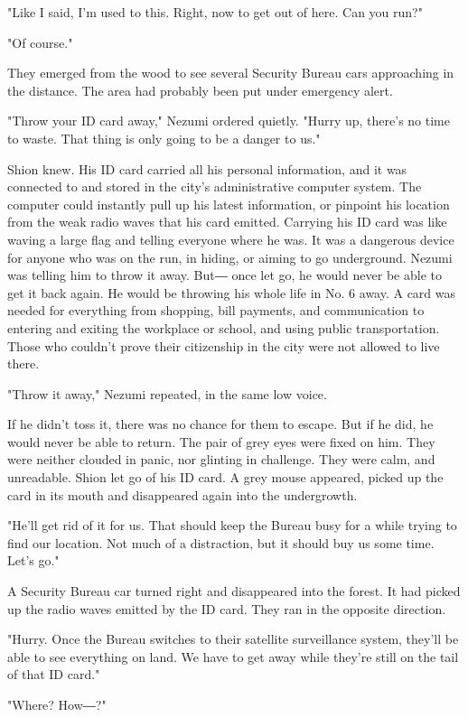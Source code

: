 "Like I said, I'm used to this. Right, now to get out of here. Can you
run?"

"Of course."

They emerged from the wood to see several Security Bureau cars
approaching in the distance. The area had probably been put under
emergency alert.

"Throw your ID card away," Nezumi ordered quietly. "Hurry up, there's no
time to waste. That thing is only going to be a danger to us."

Shion knew. His ID card carried all his personal information, and it was
connected to and stored in the city's administrative computer system.
The computer could instantly pull up his latest information, or pinpoint
his location from the weak radio waves that his card emitted. Carrying
his ID card was like waving a large flag and telling everyone where he
was. It was a dangerous device for anyone who was on the run, in hiding,
or aiming to go underground. Nezumi was telling him to throw it away.
But― once let go, he would never be able to get it back again. He would
be throwing his whole life in No. 6 away. A card was needed for
everything from shopping, bill payments, and communication to entering
and exiting the workplace or school, and using public transportation.
Those who couldn't prove their citizenship in the city were not allowed
to live there.

"Throw it away," Nezumi repeated, in the same low voice.

If he didn't toss it, there was no chance for them to escape. But if he
did, he would never be able to return. The pair of grey eyes were fixed
on him. They were neither clouded in panic, nor glinting in challenge.
They were calm, and unreadable. Shion let go of his ID card. A grey
mouse appeared, picked up the card in its mouth and disappeared again
into the undergrowth.

"He'll get rid of it for us. That should keep the Bureau busy for a
while trying to find our location. Not much of a distraction, but it
should buy us some time. Let's go."

A Security Bureau car turned right and disappeared into the forest. It
had picked up the radio waves emitted by the ID card. They ran in the
opposite direction.

"Hurry. Once the Bureau switches to their satellite surveillance system,
they'll be able to see everything on land. We have to get away while
they're still on the tail of that ID card."

"Where? How―?"

